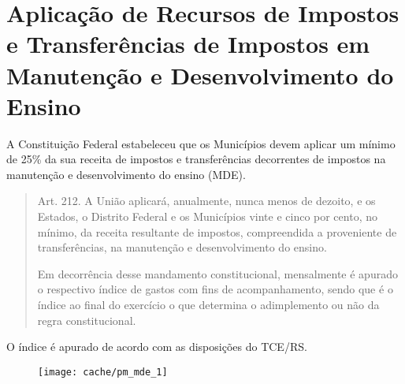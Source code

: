 
\section[Aplicação de Recursos em MDE]{Aplicação de Recursos de Impostos e Transferências de Impostos em Manutenção e Desenvolvimento do Ensino}

A Constituição Federal estabeleceu que os Municípios devem aplicar um mínimo de 25\% da sua receita de impostos e transferências decorrentes de impostos na manutenção e desenvolvimento do ensino (MDE).

\begin{quotation}
Art. 212. A União aplicará, anualmente, nunca menos de dezoito, e os Estados, o Distrito Federal e os Municípios vinte e cinco por cento, no mínimo, da receita resultante de impostos, compreendida a proveniente de transferências, na manutenção e desenvolvimento do ensino.
 
Em decorrência desse mandamento constitucional, mensalmente é apurado o respectivo índice de gastos com fins de acompanhamento, sendo que é o índice ao final do exercício o que determina o adimplemento ou não da regra constitucional.
\end{quotation}



O índice é apurado de acordo com as disposições do TCE/RS.

\begin{figure}[H]
\center
\texttt{[image: cache/pm\_mde\_1]}
\end{figure}

